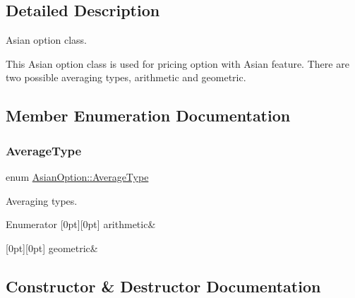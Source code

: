 \subsection{Detailed Description}
Asian option class. 

This Asian option class is used for pricing option with Asian feature. There are two possible averaging types, arithmetic and geometric. 

\subsection{Member Enumeration Documentation}
\hypertarget{class_asian_option_add7292791bf85820ff9fdbfd4407f3b9}{}\label{class_asian_option_add7292791bf85820ff9fdbfd4407f3b9} 
\subsubsection{\texorpdfstring{Average\+Type}{AverageType}}
{\footnotesize\ttfamily enum \hyperlink{class_asian_option_add7292791bf85820ff9fdbfd4407f3b9}{Asian\+Option\+::\+Average\+Type}}



Averaging types. 

\begin{DoxyEnumFields}{Enumerator}
[0pt][0pt]{}\hypertarget{class_asian_option_add7292791bf85820ff9fdbfd4407f3b9aff8fffb81d05144807269caa96d3b145}{}\label{class_asian_option_add7292791bf85820ff9fdbfd4407f3b9aff8fffb81d05144807269caa96d3b145} 
arithmetic&\\
\hline

[0pt][0pt]{}\hypertarget{class_asian_option_add7292791bf85820ff9fdbfd4407f3b9a17b74dba78a6e25158da4eb685ecfa4e}{}\label{class_asian_option_add7292791bf85820ff9fdbfd4407f3b9a17b74dba78a6e25158da4eb685ecfa4e} 
geometric&\\
\hline

\end{DoxyEnumFields}


\subsection{Constructor \& Destructor Documentation}
\hypertarget{class_asian_option_aa4020dfa8edd8d1e8f2756b633b3828b}{}\label{class_asian_option_aa4020dfa8edd8d1e8f2756b633b3828b} 
